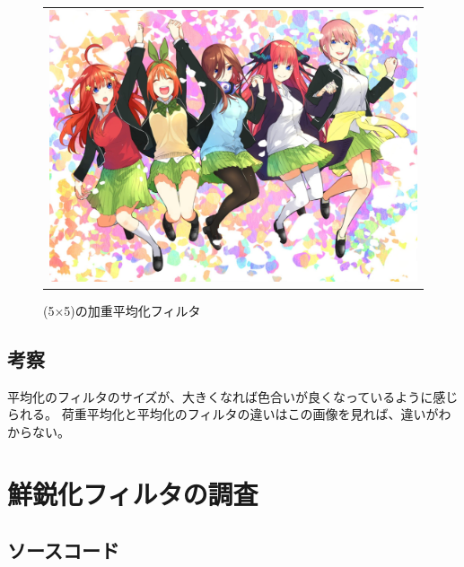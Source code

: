 \documentclass[a4paper,11pt,titlepage]{bxjsarticle}
\begin{document}
\begin{figure}[htpb]
\begin{tabular}{c}
 
      \begin{minipage}{0.06\hsize}
        \hspace{2mm}
      \end{minipage}
 
 
 
      \begin{minipage}{0.47\hsize}
        \centering
          \includegraphics[keepaspectratio, scale=0.07, angle=0]
                          {output5_4.jpg}
                          \caption{(5×5)の加重平均化フィルタ}
                          \label{fig:sin_4x}
      \end{minipage}
 
 
    \end{tabular}
\end{figure}          

\subsection{考察}
平均化のフィルタのサイズが、大きくなれば色合いが良くなっているように感じられる。
荷重平均化と平均化のフィルタの違いはこの画像を見れば、違いがわからない。

\section{鮮鋭化フィルタの調査}

\subsection{ソースコード}

\end{document}

